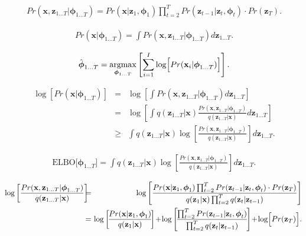 \documentclass[letterpaper,twoside,openany, titlepage,oldfontcommands,titles,dvipsnames]{memoir}
\begin{document}
\begin{eqnarray}\label{eq:diffusion_joint_reverse}
 Pr(\mathbf{x},\mathbf{z}_{1\ldots T}|\boldsymbol\phi_{1\ldots T}) = Pr(\mathbf{x}|\mathbf{z}_{1},\boldsymbol\phi_1)\prod_{t=2}^{T}Pr(\mathbf{z}_{t-1}|\mathbf{z}_{t},\boldsymbol\phi_t)\cdot Pr(\mathbf{z}_{T}).
 \end{eqnarray}

\begin{eqnarray}\label{eq:diffusion_marginalize}
 Pr(\mathbf{x}|\boldsymbol\phi_{1\ldots T}) = \int Pr(\mathbf{x},\mathbf{z}_{1\ldots T}|\boldsymbol\phi_{1\ldots T}) d\mathbf{z}_{1\ldots T}.
 \end{eqnarray}

\begin{eqnarray}
 \hat{\boldsymbol\phi}_{1\ldots T} = \mathop{\rm argmax}_{\boldsymbol\phi_{1\ldots T}}
 \left[\sum_{i=1}^{I}\log\Bigl[Pr(\mathbf{x}_i|\boldsymbol\phi_{1\ldots T})\Bigr]\right].
 \end{eqnarray}

\begin{eqnarray}
 \log\left[Pr(\mathbf{x}|\boldsymbol\phi_{1\ldots T})\right] &=& \log\left[\int Pr(\mathbf{x},\mathbf{z}_{1\ldots T}|\boldsymbol\phi_{1\ldots T}) d\mathbf{z}_{1\ldots T}\right]\nonumber\\
 &=& \log\left[\int q(\mathbf{z}_{1\ldots T}|\mathbf{x})
 \frac{Pr(\mathbf{x},\mathbf{z}_{1\ldots T}|\boldsymbol\phi_{1\ldots T}) }{q(\mathbf{z}_{1\ldots T}|\mathbf{x})}d\mathbf{z}_{1\ldots T}\right]\nonumber \\
 &\geq& \int q(\mathbf{z}_{1\ldots T}|\mathbf{x})\log\left[
 \frac{Pr(\mathbf{x},\mathbf{z}_{1\ldots T}|\boldsymbol\phi_{1\ldots T}) }{q(\mathbf{z}_{1\ldots T}|\mathbf{x})}\right]d\mathbf{z}_{1\ldots T}.
 \end{eqnarray}

\begin{eqnarray}\label{eq:diffusion_loss_1}
 \mbox{ELBO}\bigl[\boldsymbol\phi_{1\ldots T}\bigr] = \int q(\mathbf{z}_{1\ldots T}|\mathbf{x})\log\left[
 \frac{Pr(\mathbf{x},\mathbf{z}_{1\ldots T}|\boldsymbol\phi_{1\ldots T}) }{q(\mathbf{z}_{1\dots T}|\mathbf{x})}\right]d\mathbf{z}_{1\ldots T}.
 \end{eqnarray}



\begin{eqnarray}\label{eq:diffusion_simplify_1}
 \!\log\left[
 \frac{Pr(\mathbf{x},\mathbf{z}_{1\ldots T}|\boldsymbol\phi_{1\ldots T}) }{q(\mathbf{z}_{1\ldots T}|\mathbf{x})}\right]\!\!&\!\!=\!\!&\!\! \log\left[
 \frac{ Pr(\mathbf{x}|\mathbf{z}_{1},\boldsymbol\phi_1)\prod_{t=2}^{T}Pr(\mathbf{z}_{t-1}|\mathbf{z}_{t},\boldsymbol\phi_t)\cdot Pr(\mathbf{z}_{T})}{q(\mathbf{z}_{1}|\mathbf{x})\prod_{t=2}^{T}q(\mathbf{z}_{t}|\mathbf{z}_{t-1})}\right] \\
 \!\!&\!\!=\!\!&\!\! \log\left[\!\frac{ Pr(\mathbf{x}|\mathbf{z}_{1},\boldsymbol\phi_1)}{q(\mathbf{z}_{1}|\mathbf{x})}\!\right]\!+\!\log\left[\!\frac{\prod_{t=2}^{T}Pr(\mathbf{z}_{t-1}|\mathbf{z}_{t},\boldsymbol\phi_t)}{\prod_{t=2}^{T}q(\mathbf{z}_{t}|\mathbf{z}_{t-1})}\!\right]\!+\!\log\Bigl[Pr(\mathbf{z}_{T})\Bigr]. \nonumber
 \end{eqnarray}
\end{document}
